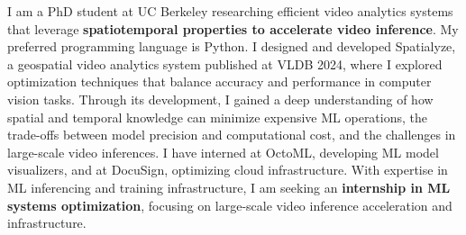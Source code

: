 

\begin{cvparagraph}

I am a PhD student at UC Berkeley researching efficient video analytics systems that leverage {\bf spatiotemporal properties to accelerate video inference}.
My preferred programming language is Python.
I designed and developed Spatialyze, a geospatial video analytics system published at VLDB 2024, where I explored optimization techniques that balance accuracy and performance in computer vision tasks.
Through its development, I gained a deep understanding of how spatial and temporal knowledge can minimize expensive ML operations, the trade-offs between model precision and computational cost, and the challenges in large-scale video inferences.
I have interned at OctoML, developing ML model visualizers, and at DocuSign, optimizing cloud infrastructure.
With expertise in ML inferencing and training infrastructure, I am seeking an {\bf internship in ML systems optimization}, focusing on large-scale video inference acceleration and infrastructure.
\end{cvparagraph}
